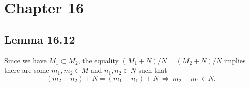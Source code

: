 \section{Chapter 16}

\subsection{Lemma 16.12}

Since we have $M_1\subset M_2$, the equality $(M_1+N)/N=(M_2+N)/N$ implies there are some $m_1,m_2\in M$ and $n_1,n_2\in N$ such that 
\[(m_2+n_2)+N=(m_1+n_1)+N ~\Rightarrow~ m_2-m_1\in N.\]